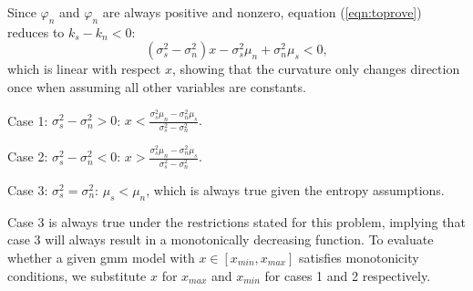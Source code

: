 {\begin{subappendices}
    Since $\varphi_n$ and  $\varphi_n$ are always positive and nonzero, equation (\ref{eqn:toprove}) reduces to $k_s - k_n < 0$:
    \begin{equation}
        (\sigma_s^2 - \sigma_n^2) x - \sigma_s^2\mu_n +\sigma_n^2\mu_s < 0,
    \end{equation}
    which is linear with respect $x$, showing that the curvature only changes direction once when assuming all other variables are constants. 
    
    Case 1: $\sigma_s^2 - \sigma_n^2 > 0$: $ x < \frac{\sigma_s^2\mu_n - \sigma_n^2\mu_s}{\sigma_s^2 - \sigma_n^2}.$
    
    Case 2: $\sigma_s^2 - \sigma_n^2 < 0$: $x > \frac{\sigma_s^2\mu_n - \sigma_n^2\mu_s}{\sigma_s^2 - \sigma_n^2}.$
    
    Case 3: $\sigma_s^2 = \sigma_n^2$: $\mu_s < \mu_n$, which is always true given the entropy assumptions.
    
    Case 3 is always true under the restrictions stated for this problem, implying that case 3 will always result in a monotonically decreasing function. To evaluate whether a given \ac{gmm} model with $x \in [x_{min}, x_{max}]$ satisfies monotonicity conditions, we substitute $x$ for $x_{max}$ and $x_{min}$ for cases 1 and 2 respectively.
    
    
    

\end{subappendices}}
